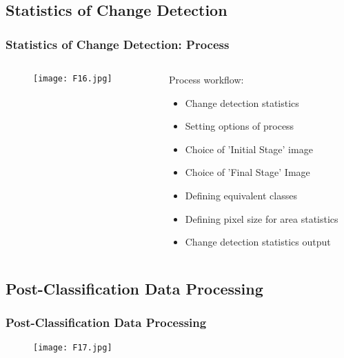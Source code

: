 \documentclass[pdflatex,compress,8pt,
	xcolor={dvipsnames,dvipsnames,svgnames,x11names,table},
	hyperref={	
	breaklinks = true, 
	pdfauthor={Lemenkova Polina}, 
	pdfsubject={Preentation}, 
	pdfcreator={Lemenkova Polina}, 
	pdfproducer={Lemenkova Polina}, 
	colorlinks=true,
	linkcolor=Gold1, 
	citecolor=NavyBlue, 
	urlcolor = NavyBlue, 
	breaklinks = true}]{beamer}
\begin{document}
\subsection{Statistics of Change Detection}
\begin{frame}\frametitle{Statistics of Change Detection: Process}
\begin{minipage}[0.4\textheight]{\textwidth}
\begin{columns}[T]
\begin{column}{0.7\textwidth}
\begin{figure}[H]
	\centering
		\texttt{[image: F16.jpg]}
\end{figure}
\end{column}
\begin{column}{0.3\textwidth}
Process workflow:
\begin{itemize}
	\item Change detection statistics
	\item Setting options of process
	\item Choice of 'Initial Stage' image
	\item Choice of 'Final Stage' Image
	\item Defining equivalent classes
	\item Defining pixel size for area statistics
	\item Change detection statistics output
\end{itemize}
\end{column}
\end{columns}
\end{minipage}
\end{frame}

\subsection{Post-Classification Data Processing}
\begin{frame}\frametitle{ Post-Classification Data Processing}
\begin{figure}[H]
	\centering
		\texttt{[image: F17.jpg]}
\end{figure}
\end{frame}
\end{document}
